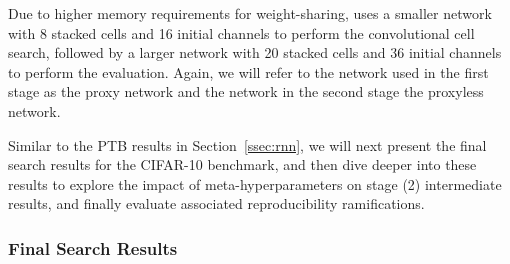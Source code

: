 \documentclass[acmlarge, nonacm]{acmart}
\begin{document}
Due to higher memory requirements for weight-sharing, \citet{liu2018darts} uses a smaller network with 8 stacked cells and 16 initial channels to perform the convolutional cell search, followed by a larger network with 20 stacked cells and 36 initial channels to perform the evaluation.  Again, we will refer to the network used in the first stage as the proxy network and the network in the second stage the proxyless network.  

Similar to the PTB results in Section~\ref{ssec:rnn}, we will next present the final search results for the CIFAR-10 benchmark, and then dive deeper into these results to explore the impact of meta-hyperparameters on stage (2) intermediate results, and finally evaluate associated reproducibility ramifications.

\subsubsection{Final Search Results}
\end{document}

